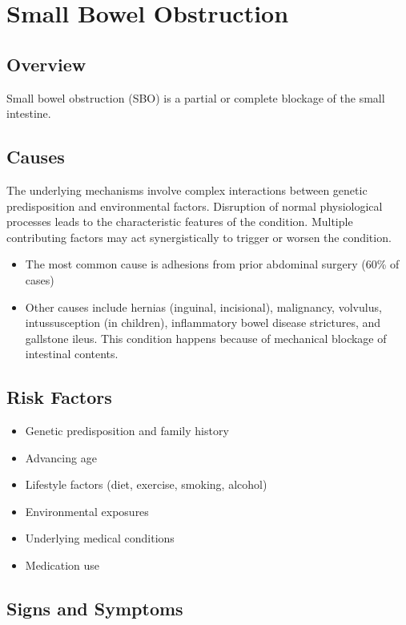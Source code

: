 \chapter{Small Bowel Obstruction}
\label{sec:Small Bowel Obstruction}

\section{Overview}
Small bowel obstruction (SBO) is a partial or complete blockage of the small intestine.
\section{Causes}
The underlying mechanisms involve complex interactions between genetic predisposition and environmental factors. Disruption of normal physiological processes leads to the characteristic features of the condition. Multiple contributing factors may act synergistically to trigger or worsen the condition.

\begin{itemize}[noitemsep]
  \item The most common cause is adhesions from prior abdominal surgery (60\% of cases)
  \item Other causes include hernias (inguinal, incisional), malignancy, volvulus, intussusception (in children), inflammatory bowel disease strictures, and gallstone ileus. This condition happens because of mechanical blockage of intestinal contents.
\end{itemize}
\section{Risk Factors}


\begin{itemize}[noitemsep]
  \item Genetic predisposition and family history
  \item Advancing age
  \item Lifestyle factors (diet, exercise, smoking, alcohol)
  \item Environmental exposures
  \item Underlying medical conditions
  \item Medication use
\end{itemize}
\section{Signs and Symptoms}

